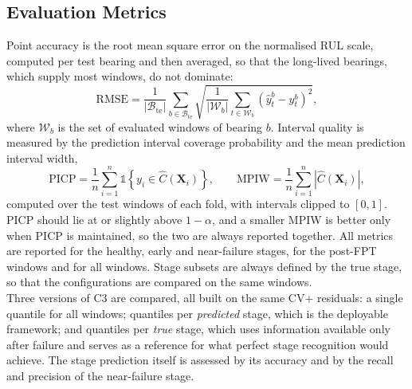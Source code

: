 \subsection{Evaluation Metrics}
\label{sec:metrics}

Point accuracy is the root mean square error on the normalised RUL
scale, computed per test bearing and then averaged, so that the
long-lived bearings, which supply most windows, do not dominate:
\begin{equation}
  \mathrm{RMSE} = \frac{1}{|\mathcal{B}_{\mathrm{te}}|}
  \sum_{b \in \mathcal{B}_{\mathrm{te}}}
  \sqrt{ \frac{1}{|\mathcal{W}_b|} \sum_{t \in \mathcal{W}_b}
  \left( \hat{y}^{b}_{t} - y^{b}_{t} \right)^2 } ,
  \label{eq:rmse}
\end{equation}
where $\mathcal{W}_b$ is the set of evaluated windows of bearing $b$.
Interval quality is measured by the prediction interval coverage
probability and the mean prediction interval width,
\begin{equation}
  \mathrm{PICP} = \frac{1}{n} \sum_{i=1}^{n}
  \mathbb{1}\left\{ y_i \in \hat{C}(\mathbf{X}_i) \right\},
  \qquad
  \mathrm{MPIW} = \frac{1}{n} \sum_{i=1}^{n}
  \left| \hat{C}(\mathbf{X}_i) \right| ,
  \label{eq:picp_mpiw}
\end{equation}
computed over the test windows of each fold, with intervals clipped to
$[0,1]$. PICP should lie at or slightly above $1-\alpha$, and a smaller
MPIW is better only when PICP is maintained, so the two are always
reported together. All metrics are reported for the healthy, early and
near-failure stages, for the post-FPT windows and for all windows.
Stage subsets are always defined by the true stage, so that the
configurations are compared on the same windows.\\

Three versions of C3 are compared, all built on the same CV+
residuals: a single quantile for all windows; quantiles per
\emph{predicted} stage, which is the deployable framework; and
quantiles per \emph{true} stage, which uses information available only
after failure and serves as a reference for what perfect stage
recognition would achieve. The stage prediction itself is assessed by
its accuracy and by the recall and precision of the near-failure
stage.
